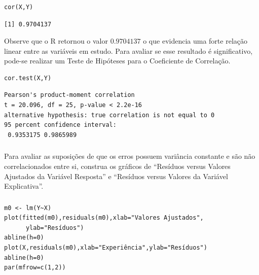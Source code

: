 \documentclass[14pt,aspectratio=1610]{beamer}
\begin{document}
\begin{frame}[fragile]{}
\frametitle{ }
\begin{block}{}
\begin{verbatim}
cor(X,Y)    
\end{verbatim}
\begin{verbatim}
[1] 0.9704137    
\end{verbatim}

Observe que o R retornou o valor $0.9704137$ o que evidencia uma forte relação linear entre as variáveis em estudo. Para avaliar se esse resultado é significativo, pode-se realizar um Teste de Hipóteses para o Coeficiente de Correlação.

\begin{verbatim}
cor.test(X,Y)    
\end{verbatim}
\begin{verbatim}
Pearson's product-moment correlation
t = 20.096, df = 25, p-value < 2.2e-16
alternative hypothesis: true correlation is not equal to 0
95 percent confidence interval:
 0.9353175 0.9865989
\end{verbatim}
\end{block}
\end{frame}

\begin{frame}[fragile]{}
\frametitle{}
\begin{block}{}
\justifying
Para avaliar as suposições de que os erros possuem variância constante e são não correlacionados entre si, construa os gráficos de ``Resíduos versus Valores Ajustados da Variável Resposta'' e ``Resíduos versus Valores da Variável Explicativa''.
\end{block}
\end{frame}

\begin{frame}[fragile]{}
\frametitle{ }
\begin{block}{}
\justifying

\begin{verbatim}
m0 <- lm(Y~X)
plot(fitted(m0),residuals(m0),xlab="Valores Ajustados",
      ylab="Resíduos")
abline(h=0)
plot(X,residuals(m0),xlab="Experiência",ylab="Resíduos")
abline(h=0)
par(mfrow=c(1,2))    
\end{verbatim}
\end{block}

\end{frame}
\end{document}
